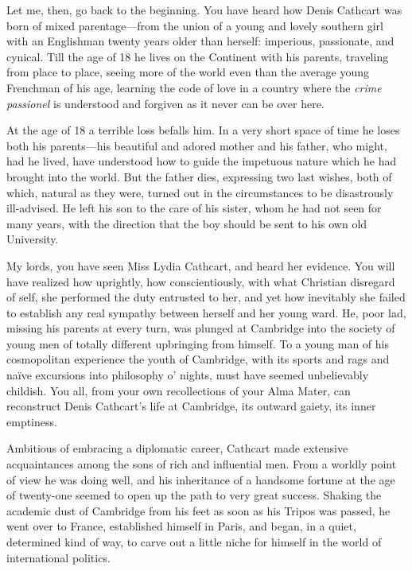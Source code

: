 \begin{dialogue}
Let me, then, go back to the beginning. You have heard how Denis Cathcart was born of mixed parentage\allowbreak---\allowbreak from the union of a young and lovely southern girl with an Englishman twenty years older than herself: imperious, passionate, and cynical. Till the age of 18 he lives on the Continent with his parents, traveling from place to place, seeing more of the world even than the average young Frenchman of his age, learning the code of love in a country where the \textit{crime passionel} is understood and forgiven as it never can be over here.

\smallskip 

At the age of 18 a terrible loss befalls him. In a very short space of time he loses both his parents\allowbreak---\allowbreak his beautiful and adored mother and his father, who might, had he lived, have understood how to guide the impetuous nature which he had brought into the world. But the father dies, expressing two last wishes, both of which, natural as they were, turned out in the circumstances to be disastrously ill-advised. He left his son to the care of his sister, whom he had not seen for many years, with the direction that the boy should be sent to his own old University.

\smallskip 

My lords, you have seen Miss Lydia Cathcart, and heard her evidence. You will have realized how uprightly, how conscientiously, with what Christian disregard of self, she performed the duty entrusted to her, and yet how inevitably she failed to establish any real sympathy between herself and her young ward. He, poor lad, missing his parents at every turn, was plunged at Cambridge into the society of young men of totally different upbringing from himself. To a young man of his cosmopolitan experience the youth of Cambridge, with its sports and rags and naïve excursions into philosophy o' nights, must have seemed unbelievably childish. You all, from your own recollections of your Alma Mater, can reconstruct Denis Cathcart's life at Cambridge, its outward gaiety, its inner emptiness.

\smallskip 

Ambitious of embracing a diplomatic career, Cathcart made extensive acquaintances among the sons of rich and influential men. From a worldly point of view he was doing well, and his inheritance of a handsome fortune at the age of twenty-one seemed to open up the path to very great success. Shaking the academic dust of Cambridge from his feet as soon as his Tripos was passed, he went over to France, established himself in Paris, and began, in a quiet, determined kind of way, to carve out a little niche for himself in the world of international politics.


\end{dialogue}
